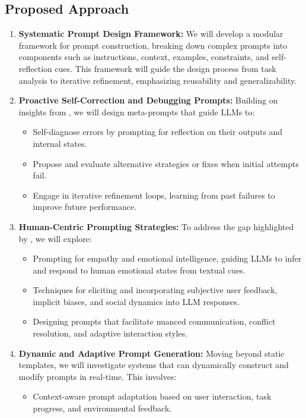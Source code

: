 \documentclass{article}
\newcommand{\citePone}{\cite{paper1}}
\newcommand{\citePtwo}{\cite{paper2}}
\begin{document}
\subsection{Proposed Approach}
\begin{enumerate}[noitemsep]
    \item \textbf{Systematic Prompt Design Framework:} We will develop a modular framework for prompt construction, breaking down complex prompts into components such as instructions, context, examples, constraints, and self-reflection cues. This framework will guide the design process from task analysis to iterative refinement, emphasizing reusability and generalizability.
    \item \textbf{Proactive Self-Correction and Debugging Prompts:} Building on insights from \citePone{}, we will design meta-prompts that guide LLMs to:
    \begin{itemize}[noitemsep]
        \item Self-diagnose errors by prompting for reflection on their outputs and internal states.
        \item Propose and evaluate alternative strategies or fixes when initial attempts fail.
        \item Engage in iterative refinement loops, learning from past failures to improve future performance.
    \end{itemize}
    \item \textbf{Human-Centric Prompting Strategies:} To address the gap highlighted by \citePtwo{}, we will explore:
    \begin{itemize}[noitemsep]
        \item Prompting for empathy and emotional intelligence, guiding LLMs to infer and respond to human emotional states from textual cues.
        \item Techniques for eliciting and incorporating subjective user feedback, implicit biases, and social dynamics into LLM responses.
        \item Designing prompts that facilitate nuanced communication, conflict resolution, and adaptive interaction styles.
    \end{itemize}
    \item \textbf{Dynamic and Adaptive Prompt Generation:} Moving beyond static templates, we will investigate systems that can dynamically construct and modify prompts in real-time. This involves:
    \begin{itemize}[noitemsep]
        \item Context-aware prompt adaptation based on user interaction, task progress, and environmental feedback.

\end{itemize}
\end{enumerate}
\end{document}
